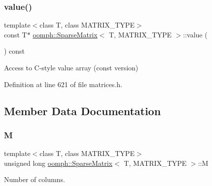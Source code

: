 \mbox{\label{classoomph_1_1SparseMatrix_a4d78622bb3cbfe1f39bb175355fb23fb}} 
\subsubsection{\texorpdfstring{value()}{value()}\hspace{0.1cm}{\footnotesize\ttfamily [2/2]}}
{\footnotesize\ttfamily template$<$class T, class M\+A\+T\+R\+I\+X\+\_\+\+T\+Y\+PE$>$ \\
const T$\ast$ \hyperlink{classoomph_1_1SparseMatrix}{oomph\+::\+Sparse\+Matrix}$<$ T, M\+A\+T\+R\+I\+X\+\_\+\+T\+Y\+PE $>$\+::value (\begin{DoxyParamCaption}{ }\end{DoxyParamCaption}) const\hspace{0.3cm}{\ttfamily [inline]}}



Access to C-\/style value array (const version) 



Definition at line 621 of file matrices.\+h.



\subsection{Member Data Documentation}
\mbox{\label{classoomph_1_1SparseMatrix_ae558ff039363bd2aa163525442090508}} 
\subsubsection{\texorpdfstring{M}{M}}
{\footnotesize\ttfamily template$<$class T, class M\+A\+T\+R\+I\+X\+\_\+\+T\+Y\+PE$>$ \\
unsigned long \hyperlink{classoomph_1_1SparseMatrix}{oomph\+::\+Sparse\+Matrix}$<$ T, M\+A\+T\+R\+I\+X\+\_\+\+T\+Y\+PE $>$\+::M\hspace{0.3cm}{\ttfamily [protected]}}



Number of columns. 



